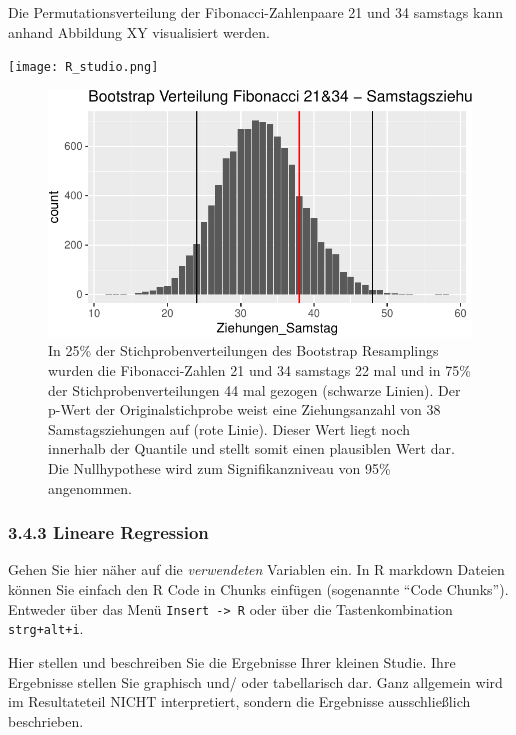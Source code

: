 \documentclass[ngerman,]{article}
\begin{document}
Die Permutationsverteilung der Fibonacci-Zahlenpaare 21 und 34 samstags
kann anhand Abbildung XY visualisiert werden.

\begin{center}
\texttt{[image: R\_studio.png]}
\begin{figure}

\includegraphics{Abbildung/Permut_21_34sa-1} \hfill{}

\caption{In 25\% der Stichprobenverteilungen des Bootstrap Resamplings wurden die Fibonacci-Zahlen 21 und 34 samstags 22 mal und in 75\% der Stichprobenverteilungen 44 mal gezogen (schwarze Linien). Der p-Wert der Originalstichprobe weist eine Ziehungsanzahl von 38 Samstagsziehungen auf (rote Linie). Dieser Wert liegt noch innerhalb der Quantile und stellt somit einen plausiblen Wert dar. Die Nullhypothese wird zum Signifikanzniveau von 95\% angenommen.}\label{fig:Permut_21_34sa}
\end{figure}
\end{center}

\subsubsection{3.4.3 Lineare Regression}\label{lineare-regression}

Gehen Sie hier näher auf die \emph{verwendeten} Variablen ein. In R
markdown Dateien können Sie einfach den R Code in Chunks einfügen
(sogenannte ``Code Chunks''). Entweder über das Menü
\texttt{Insert\ -\textgreater{}\ R} oder über die Tastenkombination
\texttt{strg+alt+i}.

Hier stellen und beschreiben Sie die Ergebnisse Ihrer kleinen Studie.
Ihre Ergebnisse stellen Sie graphisch und/ oder tabellarisch dar. Ganz
allgemein wird im Resultateteil NICHT interpretiert, sondern die
Ergebnisse ausschließlich beschrieben.
\end{document}
